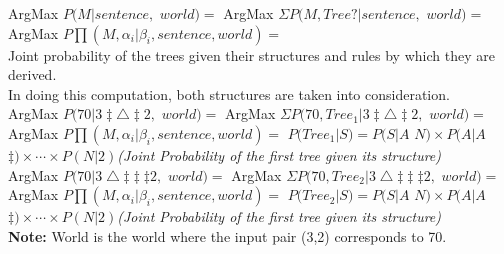 \documentclass[12pt,a4paper]{article}
\begin{document}
\noindent ArgMax $P(M|sentence,$ $world)=$
ArgMax $\Sigma P(M,Tree?|sentence,$ $world)=$\\
ArgMax $P\prod(M,\alpha_{i}|\beta_{i},sentence,world)=$\\   
Joint probability of the trees given their structures and rules by which they are derived.\\

\noindent In doing this computation, both structures are taken into consideration.\\

\noindent ArgMax $P(70|3\ddagger \bigtriangleup \ddagger 2,$ $world)=$ 
ArgMax $\Sigma P(70,Tree_{1}|3\ddagger \bigtriangleup \ddagger 2,$ $world)=$\\
ArgMax $P\prod(M,\alpha_{i}|\beta_{i},sentence,world)=$  
$P(Tree_{1}|S)=P(S|A$ $N)\times P(A| A$ $\ddagger)\times \cdots \times P(N|2)$\textit{(Joint Probability of the first tree given its structure)}\\


\noindent ArgMax $P(70|3 \bigtriangleup \ddagger \ddagger \ddagger 2,$ $world)=$ 
ArgMax $\Sigma P(70,Tree_{2}|3 \bigtriangleup \ddagger \ddagger \ddagger 2,$ $world)=$\\
ArgMax $P \prod(M,\alpha_{i}|\beta_{i},sentence,world)=$
$P(Tree_{2}|S)=P(S|A$ $N)\times P(A| A$ $\ddagger)\times \cdots \times P(N|2)$\textit{(Joint Probability of the first tree given its structure)}\\

\noindent \textbf{Note:} World is the world where the input pair (3,2) corresponds to 70.
\end{document}
